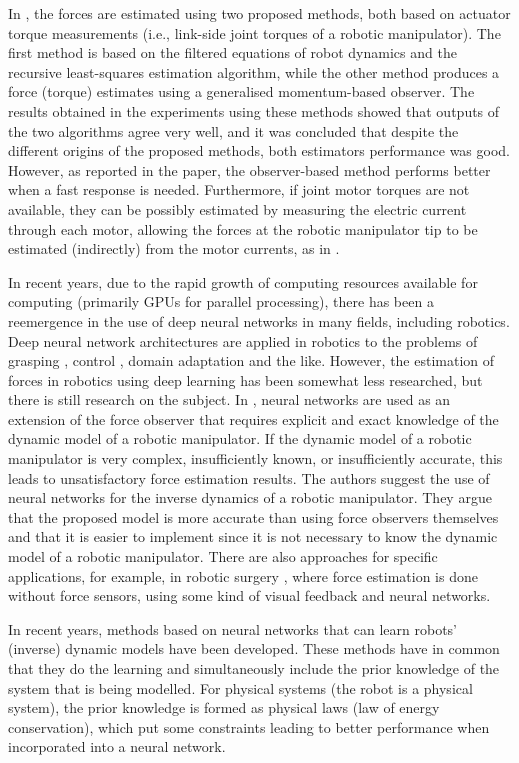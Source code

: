 In \cite{Damme2011}, the forces are estimated using two proposed methods, both based on actuator torque measurements (i.e., link-side joint torques of a robotic manipulator). The first method is based on the filtered equations of robot dynamics and the recursive least-squares estimation algorithm, while the other method produces a force (torque) estimates using a generalised momentum-based observer. The results obtained in the experiments using these methods showed that outputs of the two algorithms agree very well, and it was concluded that despite the different origins of the proposed methods, both estimators performance was good. However, as reported in the paper, the observer-based method performs better when a fast response is needed. Furthermore, if joint motor torques are not available, they can be possibly estimated by measuring the electric current through each motor, allowing the forces at the robotic manipulator tip to be estimated (indirectly) from the motor currents, as in \cite{Wahrburg2018}.

In recent years, due to the rapid growth of computing resources available for computing (primarily GPUs for parallel processing), there has been a reemergence in the use of deep neural networks in many fields, including robotics. Deep neural network architectures are applied in robotics to the problems of grasping \cite{Levine2017}, control \cite{Jin2018}, domain adaptation \cite{Bousmalis2018} and the like. However, the estimation of forces in robotics using deep learning has been somewhat less researched, but there is still research on the subject. In \cite{Smith2005}, neural networks are used as an extension of the force observer that requires explicit and exact knowledge of the dynamic model of a robotic manipulator. If the dynamic model of a robotic manipulator is very complex, insufficiently known, or insufficiently accurate, this leads to unsatisfactory force estimation results. The authors suggest the use of neural networks for the inverse dynamics of a robotic manipulator. They argue that the proposed model is more accurate than using force observers themselves and that it is easier to implement since it is not necessary to know the dynamic model of a robotic manipulator. There are also approaches for specific applications, for example, in robotic surgery \cite{Marban2019,Aviles2015}, where force estimation is done without force sensors, using some kind of visual feedback and neural networks.

In recent years, methods based on neural networks that can learn robots' (inverse) dynamic models have been developed. These methods have in common that they do the learning and simultaneously include the prior knowledge of the system that is being modelled. For physical systems (the robot is a physical system), the prior knowledge is formed as physical laws (law of energy conservation), which put some constraints leading to better performance when incorporated into a neural network.

